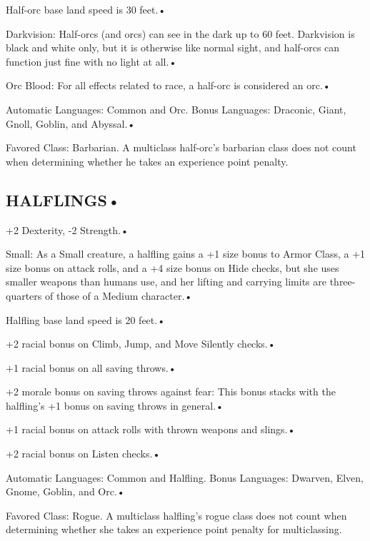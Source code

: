 \documentclass{article}
\begin{document}
Half-orc base land speed is 30 feet.• 

\parindent=7pt
Darkvision: Half-orcs (and orcs) can see in the dark up to 60 feet. Darkvision 
is black and white only, but it is otherwise like normal sight, and half-orcs can 
function just fine with no light at all.• 

\parindent=3pt
Orc Blood: For all effects related to race, a half-orc is considered an orc.• 

Automatic Languages: Common and Orc. Bonus Languages: Draconic, Giant, Gnoll, Goblin, 
and Abyssal.• 

\parindent=7pt
Favored Class: Barbarian. A multiclass half-orc's barbarian class does not count 
when determining whether he takes an experience point penalty.

\vspace{12pt}
\subsection*{{\LARGE{}HALFLINGS• }}

\parindent=3pt
+2 Dexterity, -2 Strength.• 

Small: As a Small creature, a halfling gains a +1 size bonus to Armor Class, a 
+1 size bonus on attack rolls, and a +4 size bonus on Hide checks, but she uses 
smaller weapons than humans use, and her lifting and carrying limits are three-quarters 
of those of a Medium character.• 

\parindent=7pt
Halfling base land speed is 20 feet.• 

\parindent=3pt
+2 racial bonus on Climb, Jump, and Move Silently checks.• 

+1 racial bonus on all saving throws.• 

+2 morale bonus on saving throws against fear: This bonus stacks with the halfling's 
+1 bonus on saving throws in general.• 

\parindent=7pt
+1 racial bonus on attack rolls with thrown weapons and slings.• 

\parindent=3pt
+2 racial bonus on Listen checks.• 

Automatic Languages: Common and Halfling. Bonus Languages: Dwarven, Elven, Gnome, 
Goblin, and Orc.• 

\parindent=7pt
Favored Class: Rogue. A multiclass halfling's rogue class does not count when determining 
whether she takes an experience point penalty for multiclassing.

\newpage
\end{document}
